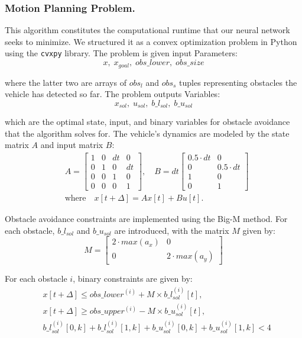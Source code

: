 \documentclass[
	letterpaper, %
	10pt, %
	unnumberedsections, %
	twoside, %
]{LTJournalArticle}
\begin{document}
\subsubsection{Motion Planning Problem.} This algorithm constitutes the computational runtime that our neural network seeks to minimize. We structured it as a convex optimization problem in Python using the \texttt{cvxpy} library. The problem is given input Parameters:
\[x,\; x_{goal},\; obs\_lower,\; obs\_size\]

\noindent where the latter two are arrays of \(obs_l\) and \(obs_s\) tuples representing obstacles the vehicle has detected so far. The problem outputs Variables:
\[x_{sol},\; u_{sol},\; b\_l_{sol},\; b\_u_{sol}\]

\noindent which are the optimal state, input, and binary variables for obstacle avoidance that the algorithm solves for. The vehicle's dynamics are modeled by the state matrix \( A \) and input matrix \( B \):
\begin{align*}
    & A = \begin{bmatrix}
        1 & 0 & dt & 0 \\
        0 & 1 & 0 & dt \\
        0 & 0 & 1 & 0  \\
        0 & 0 & 0 & 1
    \end{bmatrix}, \quad
    B = dt \begin{bmatrix}
        0.5 \cdot dt & 0 \\
        0 & 0.5 \cdot dt \\
        1 & 0 \\
        0 & 1
    \end{bmatrix} \\
    & \text{where} \quad x[t+\Delta] = Ax[t] + Bu[t].
\end{align*}

Obstacle avoidance constraints are implemented using the Big-M method. For each obstacle, \(b\_l_{sol}\) and \(b\_u_{sol}\) are introduced, with the matrix \(M\) given by:
\[M = \begin{bmatrix}
2 \cdot max(a_x) & 0 \\
0 & 2 \cdot max(a_y)
\end{bmatrix}\]

For each obstacle \(i\), binary constraints are given by:
\begin{align*}
    & x[t+\Delta] \leq obs\_lower^{(i)} + M \times b\_l_{sol}^{(i)}[t], \\
    & x[t+\Delta] \geq obs\_upper^{(i)} - M \times b\_u_{sol}^{(i)}[t], \\
    & b\_l_{sol}^{(i)}[0, k] + b\_l_{sol}^{(i)}[1, k] + b\_u_{sol}^{(i)}[0, k] + b\_u_{sol}^{(i)}[1, k] < 4
\end{align*}
\end{document}
